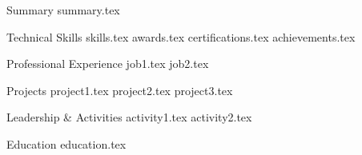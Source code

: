 \documentclass{cv_template}
\begin{document}
\makecvheader

\begin{cvsection}{Summary}
    {summary.tex}
\end{cvsection}

\begin{cvsection}{Technical Skills}
    {skills.tex}
    {awards.tex}
    {certifications.tex}
    {achievements.tex}
\end{cvsection}

\begin{cvsection}{Professional Experience}
    {job1.tex}
    {job2.tex}
\end{cvsection}

\begin{cvsection}{Projects}
    {project1.tex}
    {project2.tex}
    {project3.tex}
\end{cvsection}

\begin{cvsection}{Leadership \& Activities}
    {activity1.tex}
    {activity2.tex}
\end{cvsection}

\begin{cvsection}{Education}
    {education.tex}
\end{cvsection}
\end{document}

